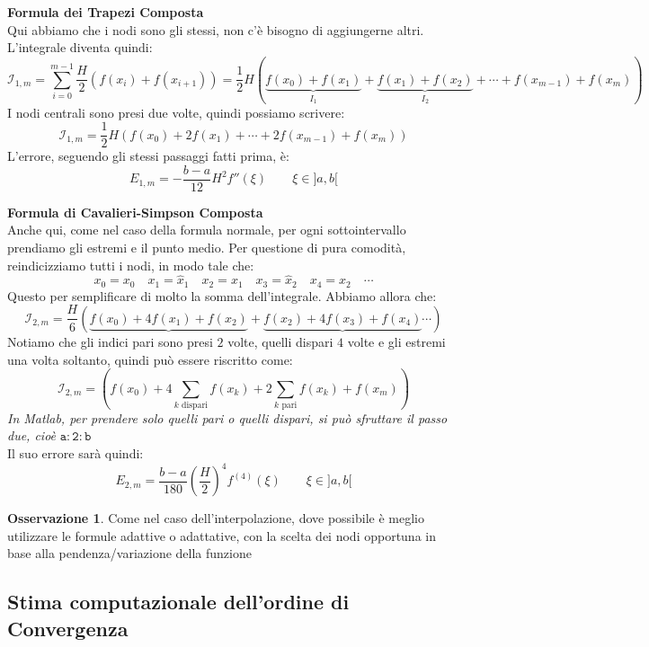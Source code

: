 \documentclass[11pt,a4paper,twoside]{article}
\theoremstyle{definition}
\newtheorem*{oss}{Osservazione}
\begin{document}
\textbf{Formula dei Trapezi Composta}\\
Qui abbiamo che i nodi sono gli stessi, non c'è bisogno di aggiungerne altri. L'integrale diventa quindi:
\[ \mathcal I_{1,m} = \sum_{i = 0}^{m-1} \frac H2 (f(x_i) + f(x_{i+1})) = \frac 12 H(\underbrace{f(x_0) + f(x_1)}_{I_1} + \underbrace{f(x_1) + f(x_2)}_{I_2} + \cdots + f(x_{m-1}) + f(x_m) ) \]
I nodi centrali sono presi due volte, quindi possiamo scrivere:
\[\mathcal I_{1,m} = \frac 12 H (f(x_0) + 2f(x_1) + \cdots + 2f(x_{m-1}) + f(x_m))\]
L'errore, seguendo gli stessi passaggi fatti prima, è:
\[ E_{1,m} = -\frac{b-a}{12} H^2 f''(\xi) \qquad \xi \in ]a,b[\]

\textbf{Formula di Cavalieri-Simpson Composta}\\
Anche qui, come nel caso della formula normale, per ogni sottointervallo prendiamo gli estremi e il punto medio. Per questione di pura comodità, reindicizziamo tutti i nodi, in modo tale che:
\[ x_0 = x_0\quad x_1 = \hat x_1 \quad x_2 = x_1 \quad x_3 = \hat x_2 \quad x_4 = x_2\quad \cdots\]
Questo per semplificare di molto la somma dell'integrale. Abbiamo allora che:
\[ \mathcal I_{2,m} = \frac H6 (\underbrace{f(x_0) + 4f(x_1) + f(x_2)} + \underbrace{f(x_2) + 4f(x_3) + f(x_4)}\cdots)\]
Notiamo che gli indici pari sono presi $2$ volte, quelli dispari $4$ volte e gli estremi una volta soltanto, quindi può essere riscritto come:
\[\mathcal I_{2,m} = \left( f(x_0) + 4 \sum_{k \text{ dispari}}f(x_k) + 2 \sum_{k\text{ pari}}f(x_k) + f(x_m)\right)\]
\textit{In Matlab, per prendere solo quelli pari o quelli dispari, si può sfruttare il passo due, cioè} $\mathtt{a:2:b}$\\
Il suo errore sarà quindi:
\[ E_{2,m} = \frac{b-a}{180} \left(\frac H2\right)^4 f^{(4)}(\xi)\qquad \xi \in ]a,b[ \]

\begin{oss}
	Come nel caso dell'interpolazione, dove possibile è meglio utilizzare le formule adattive o adattative, con la scelta dei nodi opportuna in base alla pendenza/variazione della funzione
\end{oss}

\subsection{Stima computazionale dell'ordine di Convergenza}
\end{document}
